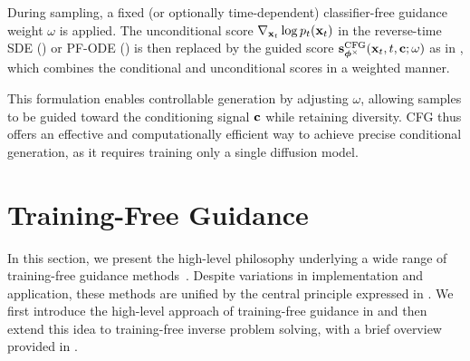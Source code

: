 During sampling, a fixed (or optionally time-dependent) classifier-free guidance weight $\omega$ is applied. The unconditional score $\nabla_{{\mathbf{x}}_t} \log p_t({\mathbf{x}}_t)$ in the reverse-time SDE () or PF-ODE () is then replaced by the guided score ${\mathbf{s}}_{\bm{\phi}^\times}^{\mathrm{CFG}}({\mathbf{x}}_t ,t, {\mathbf{c}}; \omega)$ as in , which combines the conditional and unconditional scores in a weighted manner. 

This formulation enables controllable generation by adjusting $\omega$, allowing samples to be guided toward the conditioning signal ${\mathbf{c}}$ while retaining diversity. CFG thus offers an effective and computationally efficient way to achieve precise conditional generation, as it requires training only a single diffusion model.





\clearpage
\newpage





\section{Training-Free Guidance}
In this section, we present the high-level philosophy underlying a wide range of training-free guidance methods~\citep{chung2023diffusion,ye2024tfg,he2024manifold,bansal2023universal}. Despite variations in implementation and application, these methods are unified by the central principle expressed in . We first introduce the high-level approach of training-free guidance in  and then extend this idea to training-free inverse problem solving, with a brief overview provided in .


